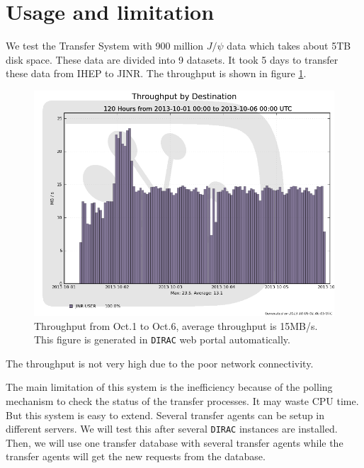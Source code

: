 \section{Usage and limitation}
We test the Transfer System with 900 million $J/\psi$ data 
which takes about 5TB disk space. 
These data are divided into 9 datasets.
It took 5 days to transfer 
these data from IHEP to JINR. The throughput is shown in 
figure \ref{fig:throughput}.
\begin{figure}[h]
\includegraphics[width=.6\textwidth, keepaspectratio]{data/throughput-dest-1001-10-06.png}
\begin{minipage}[b]{.4\textwidth}
    \caption{\label{fig:throughput}Throughput from Oct.1 to Oct.6, 
    average throughput is 15MB/s. This figure is generated in 
{\tt DIRAC} web portal automatically.}
\end{minipage}
\end{figure}
The throughput is not very high due to the poor network connectivity.

The main limitation of this system is the inefficiency because of 
the polling mechanism to check the status of the transfer processes.
It may waste CPU time. But this system is easy to extend.
Several transfer agents can be setup in different servers.
We will test this after several {\tt DIRAC} instances are installed.
Then, we will use one transfer database with several transfer agents
while the transfer agents will get the new requests from the database.
